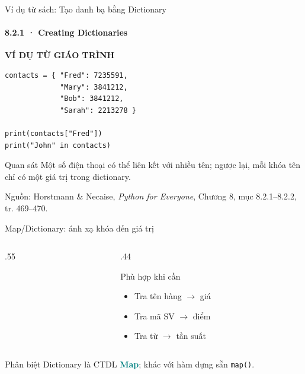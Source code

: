 \documentclass[aspectratio=169,10pt]{beamer}
\newcommand{\term}[1]{\textcolor{teal}{\textbf{#1}}}
\newcommand{\py}[1]{{\color{deepnavy}\texttt{#1}}}
\begin{document}
\begin{frame}[fragile,t]{Ví dụ từ sách: Tạo danh bạ bằng Dictionary}
\framesubtitle{8.2.1 · Creating Dictionaries}
{\small\color{teal}\textbf{VÍ DỤ TỪ GIÁO TRÌNH}}\par\medskip
\begin{Verbatim}[fontsize=\footnotesize,frame=single,framesep=3mm,rulecolor=\color{teal!35},breaklines=true]
contacts = { "Fred": 7235591,
             "Mary": 3841212,
             "Bob": 3841212,
             "Sarah": 2213278 }

print(contacts["Fred"])
print("John" in contacts)
\end{Verbatim}
\begin{block}{Quan sát}
Một số điện thoại có thể liên kết với nhiều tên; ngược lại, mỗi khóa tên chỉ có một giá trị trong dictionary.
\end{block}
\vfill
{\scriptsize\color{muted}Nguồn: Horstmann \& Necaise, \textit{Python for Everyone}, Chương 8, mục 8.2.1–8.2.2, tr. 469–470.}
\end{frame}


\begin{frame}[t]{Map/Dictionary: ánh xạ khóa đến giá trị}

\begin{columns}[T,onlytextwidth]
\begin{column}{.55\linewidth}
\centering
{}
\end{column}
\begin{column}{.44\linewidth}
\begin{block}{Phù hợp khi cần}
\begin{itemize}
\item Tra tên hàng $\to$ giá
\item Tra mã SV $\to$ điểm
\item Tra từ $\to$ tần suất
\end{itemize}
\end{block}
\end{column}
\end{columns}
\medskip
\begin{alertblock}{Phân biệt} Dictionary là CTDL \term{Map}; khác với hàm dựng sẵn \py{map()}. \end{alertblock}

\end{frame}
\end{document}
